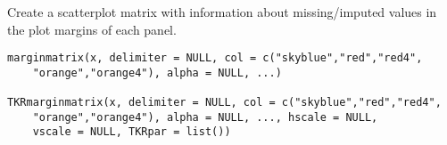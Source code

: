 %
\begin{Description}\relax
Create a scatterplot matrix with information about missing/imputed values 
in the plot margins of each panel.
\end{Description}
%
\begin{Usage}
\begin{verbatim}
marginmatrix(x, delimiter = NULL, col = c("skyblue","red","red4",
    "orange","orange4"), alpha = NULL, ...)

TKRmarginmatrix(x, delimiter = NULL, col = c("skyblue","red","red4",
    "orange","orange4"), alpha = NULL, ..., hscale = NULL,
    vscale = NULL, TKRpar = list())
\end{verbatim}
\end{Usage}
%
